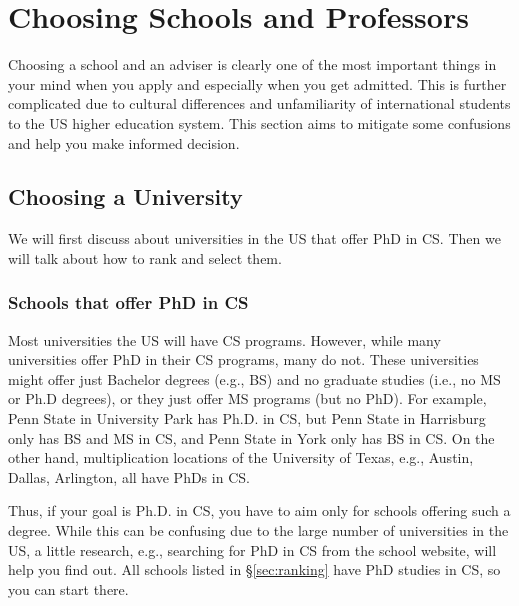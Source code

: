 \documentclass[oneside,11pt]{memoir}
\begin{document}
\chapter{Choosing Schools and Professors}\label{sec:schoolsandprofs}

Choosing a school and an adviser is clearly one of the most important things in your mind when you apply and especially when you get admitted.  This is further complicated due to cultural differences and unfamiliarity of  international students to the US higher education system.  This section aims to mitigate some confusions and help you make informed decision. 

\section{Choosing a University}

We will first discuss about universities in the US that offer PhD in CS. Then we will talk about how to rank and select them.

\subsection{Schools that offer PhD in CS}  

Most universities the US will have CS programs. 
However, while many universities offer PhD in their CS programs, many do not.  These universities might offer just Bachelor degrees (e.g., BS) and no graduate studies (i.e., no MS or Ph.D degrees), or they just offer MS programs (but no PhD). For example, Penn State in University Park has Ph.D. in CS,  but Penn State in Harrisburg only has BS and MS in CS, and Penn State in York only has BS in CS.  On the other hand, multiplication locations of the University of Texas, e.g., Austin, Dallas, Arlington, all have PhDs in CS. 

Thus, if your goal is Ph.D. in CS, you have to aim only for schools offering such a degree.  %
While this can be confusing due to the large number of universities in the US, a little research, e.g., searching for PhD in CS from the school website, will help you find out. All schools listed in \S\ref{sec:ranking} have PhD studies in CS, so you can start there.

\end{document}
